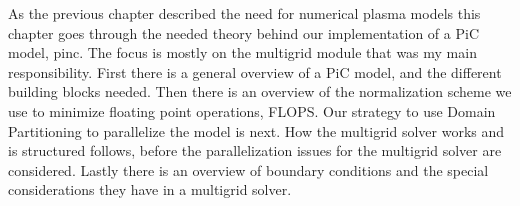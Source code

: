 As the previous chapter described the need for numerical plasma models this chapter
goes through the needed theory behind our implementation of a PiC model, pinc.
The focus is mostly on the multigrid module that was my main responsibility.
First there is a general overview of a PiC model, and the different building blocks
needed. Then there is an overview of the normalization scheme we use to minimize
floating point operations, FLOPS. Our strategy to use Domain Partitioning to
parallelize the model is next. How the multigrid solver works and is structured follows,
before the parallelization issues for the multigrid solver are considered.
Lastly there is an overview of boundary conditions and the special considerations
they have in a multigrid solver.
